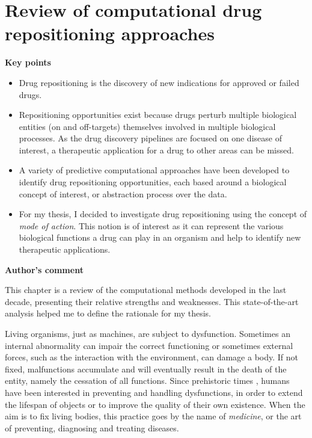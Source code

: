\chapter{Review of computational drug repositioning approaches}

\textbf{Key points}
\begin{itemize}
  \item Drug repositioning is the discovery of new indications for approved or failed drugs.
  \item Repositioning opportunities exist because drugs perturb multiple biological entities (on and off-targets) themselves involved in multiple biological processes. As the drug discovery pipelines are focused on one disease of interest, a therapeutic application for a drug to other areas can be missed.
  \item A variety of predictive computational approaches have been developed to identify drug repositioning opportunities, each based around a biological concept of interest, or abstraction process over the data.
  \item For my thesis, I decided to investigate drug repositioning using the concept of \emph{mode of action}. This notion is of interest as it can represent the various biological functions a drug can play in an organism and help to identify new therapeutic applications.
\end{itemize}

\textbf{Author's comment}

This chapter is a review of the computational methods developed in the last decade, presenting their relative strengths and weaknesses. This state-of-the-art analysis helped me to define the rationale for my thesis.

\hrulefill

Living organisms, just as machines, are subject to dysfunction. Sometimes an internal abnormality can impair the correct functioning or sometimes external forces, such as the interaction with the environment, can damage a body. If not fixed, malfunctions accumulate and will eventually result in the death of the entity, namely the cessation of all functions. Since prehistoric times \citep{prehistoricwiki}, humans have been interested in preventing and handling dysfunctions, in order to extend the lifespan of objects or to improve the quality of their own existence. When the aim is to fix living bodies, this practice goes by the name of \emph{medicine}, or the art of preventing, diagnosing and treating diseases.

